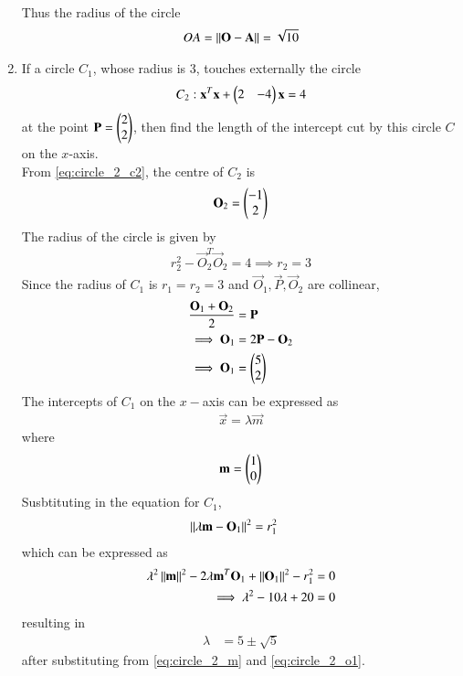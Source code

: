\documentclass[journal,12pt,twocolumn]{IEEEtran}
\begin{document}
\begin{enumerate}[label=\arabic*]
\begin{align}
\label{eq:circle_1_o}
\end{align}
%
Thus the radius of the circle 
\begin{align}
\label{eq:circle_1_r}
OA = \left\Vert\mathbf{O}-\mathbf{A}\right\Vert = \sqrt{10}
\end{align}
\item If a circle $C_1$, whose radius is 3, touches externally the circle 
\begin{equation}
\label{eq:circle_2_c2}
C_2: \mathbf{x}^T\mathbf{x} + \begin{pmatrix}2 & -4\end{pmatrix}\mathbf{x} = 4
\end{equation}
%
at the point $\mathbf{P}=\begin{pmatrix}2\\2\end{pmatrix}$, then find the length of the intercept cut by this circle $C$ on the $x$-axis.
\\
\solution From \eqref{eq:circle_2_c2}, the centre of $C_2$ is 
\begin{align}
\label{eq:circle_2_o2}
\mathbf{O}_2 = \begin{pmatrix}-1 \\ 2\end{pmatrix}
\end{align}
%
The radius of the circle is given by 
\begin{align}
\label{eq:circle_2_r2}
r_2^2-\vec{O}_2^T\vec{O}_2 = 4 \implies r_2 = 3
\end{align}
%
%
Since the radius of $C_1$ is $r_1=r_2=3$ and $\vec{O}_1, \vec{P}, \vec{O}_2$ are collinear, 
\begin{align}
\label{eq:circle_2_o1}
\frac{\mathbf{O}_1+\mathbf{O}_2}{2} &= \mathbf{P}
\nonumber \\
\implies \mathbf{O}_1 &= 2\mathbf{P}-\mathbf{O}_2
\nonumber \\
\implies \mathbf{O}_1 &= \begin{pmatrix}5 \\ 2\end{pmatrix}
\end{align}
%
The intercepts of $C_1$ on the $x-$axis can be expressed as 
\begin{align}
\label{eq:circle_2_x}
\vec{x}=\lambda\vec{m}
\end{align}
%
where
\begin{align}
\label{eq:circle_2_m}
\mathbf{m}=\begin{pmatrix}1 \\ 0\end{pmatrix}
\end{align}
Susbtituting in the equation for $C_1$,
\begin{align}
\left\Vert\lambda\mathbf{m}-\mathbf{O}_1\right\Vert^2&=r_1^2
\end{align}
which can be expressed as
\begin{align}
\lambda^2\left\Vert\mathbf{m}\right\Vert^2-2\lambda\mathbf{m}^T\mathbf{O}_1+ \left\Vert\mathbf{O}_1\right\Vert^2-r_1^2&=0
\nonumber \\
\implies \lambda^2-10\lambda+ 20&=0
\end{align}
resulting in
\begin{align}
\lambda&=5\pm\sqrt{5}
\label{eq:circle_2_lam}
\end{align}
%
after substituting from \eqref{eq:circle_2_m} and \eqref{eq:circle_2_o1}.



\end{enumerate}
\end{document}
